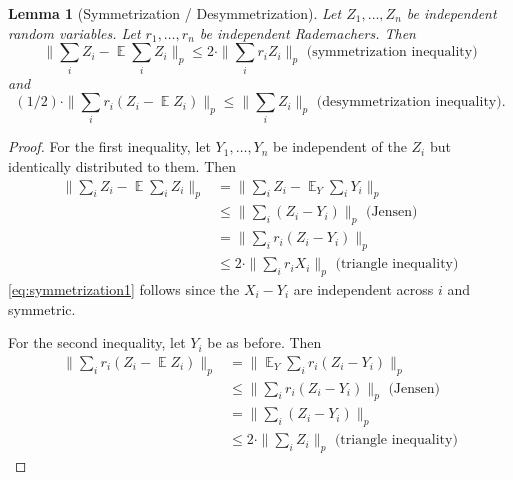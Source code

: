 \documentclass[12pt]{article}
\DeclareMathOperator*{\E}{\mathbb{E}}
\newtheorem{lemma}{Lemma}
\newcommand{\EquationName}[1]{\label{eq:#1}}
\newcommand{\LemmaName}[1]{\label{lem:#1}}
\newcommand{\Eqsub}[1]{\eqref{eq:#1}}
\begin{document}
\begin{lemma}[Symmetrization / Desymmetrization] \LemmaName{symmetrization}
Let $Z_1,\ldots,Z_n$ be independent random variables. Let $r_1,\ldots,r_n$ be independent Rademachers. Then
$$
\|\sum_i Z_i - \E\sum_i Z_i\|_p \le 2\cdot \|\sum_i r_i Z_i\|_p \text{ (symmetrization inequality)}
$$
and
$$
(1/2)\cdot \|\sum_i r_i (Z_i - \E Z_i)\|_p \le \|\sum_i Z_i\|_p \text{ (desymmetrization inequality)} .
$$
\end{lemma}
\begin{proof}
For the first inequality, let $Y_1,\ldots,Y_n$ be independent of the $Z_i$ but identically distributed to them. Then
\begin{align}
\nonumber \|\sum_i Z_i - \E\sum_i Z_i\|_p &= \|\sum_i Z_i - \E_Y \sum_i Y_i\|_p \\
\nonumber {}& \le \|\sum_i (Z_i - Y_i)\|_p \text{ (Jensen)}\\
{}& = \|\sum_i r_i (Z_i - Y_i)\|_p \EquationName{symmetrization1}\\
\nonumber {}& \le 2\cdot \|\sum_i r_i X_i\|_p\text{ (triangle inequality)}
\end{align}
\Eqsub{symmetrization1} follows since the $X_i - Y_i$ are independent across $i$ and symmetric.

For the second inequality, let $Y_i$ be as before. Then
\begin{align*}
\|\sum_i r_i (Z_i - \E Z_i)\|_p &= \|\E_Y \sum_i r_i (Z_i - Y_i)\|_p\\
{}& \le \|\sum_i r_i (Z_i - Y_i)\|_p \text{ (Jensen)}\\
{}& = \|\sum_i (Z_i - Y_i)\|_p\\
{}&\le 2\cdot \|\sum_i Z_i\|_p \text{ (triangle inequality)}
\end{align*}
\end{proof}
\end{document}
